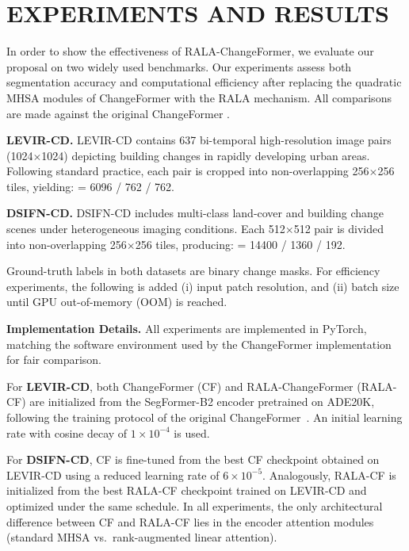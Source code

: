 \section{\uppercase{Experiments and Results}}
\label{sec:experiments}

\noindent
In order to show the effectiveness of RALA-ChangeFormer, we evaluate our proposal on two widely used benchmarks. Our experiments assess both segmentation accuracy and computational efficiency after replacing the quadratic MHSA modules of ChangeFormer with the RALA mechanism. All comparisons are made against the original ChangeFormer \cite{Bandara2022ChangeFormer}.

\noindent \textbf{LEVIR-CD.} LEVIR-CD \cite{Zheng2020LEVIR} contains 637 bi-temporal high-resolution image pairs (1024$\times$1024) depicting building changes in rapidly developing urban areas. Following standard practice, each pair is cropped into non-overlapping 256$\times$256 tiles, yielding:  = 6096 / 762 / 762.

\noindent \textbf{DSIFN-CD.} DSIFN-CD \cite{Shen2021DSIFN} includes multi-class land-cover and building change scenes under heterogeneous imaging conditions. Each 512$\times$512 pair is divided into non-overlapping 256$\times$256 tiles, producing:  = 14400 / 1360 / 192.

Ground-truth labels in both datasets are binary change masks. For efficiency experiments, the following is added (i) input patch resolution, and (ii) batch size until GPU out-of-memory (OOM) is reached.

\noindent \textbf{Implementation Details.} All experiments are implemented in PyTorch, matching the software environment used by the ChangeFormer implementation \cite{Bandara2022ChangeFormer} for fair comparison.

For \textbf{LEVIR-CD}, both ChangeFormer (CF) and RALA-ChangeFormer (RALA-CF) are initialized from the SegFormer-B2 encoder pretrained on ADE20K, following the training protocol of the original ChangeFormer~\cite{Bandara2022ChangeFormer}. An initial learning rate with cosine decay of $1\times10^{-4}$ is used.

For \textbf{DSIFN-CD}, CF is fine-tuned from the best CF checkpoint obtained on LEVIR-CD using a reduced learning rate of $6\times10^{-5}$. Analogously, RALA-CF is initialized from the best RALA-CF checkpoint trained on LEVIR-CD and optimized under the same schedule. In all experiments, the only architectural difference between CF and RALA-CF lies in the encoder attention modules (standard MHSA vs.\ rank-augmented linear attention).


